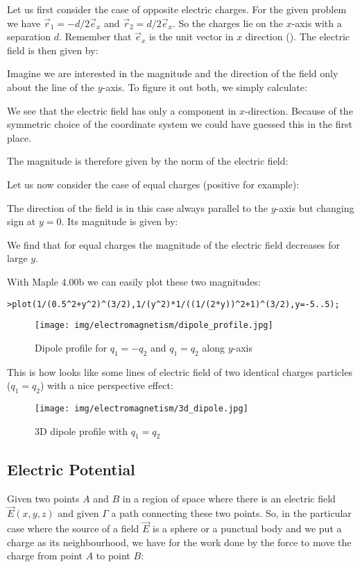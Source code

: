	Let us first consider the case of opposite electric charges. For the given problem we have $\vec{r}_1=-d/2\vec{e}_x$ and $\vec{r}_2=d/2\vec{e}_x$. So the charges lie on the $x$-axis with a separation $d$. Remember that $\vec{e}_x$ is the unit vector in $x$ direction (). The electric field is then given by:
	
	Imagine we are interested in the magnitude and the direction of the field only about the line of the $y$-axis. To figure it out both, we simply calculate:
	
	We see that the electric field has only a component in $x$-direction. Because of the symmetric choice of the coordinate system we could have guessed this in the first place.
	
	The magnitude is therefore given by the norm of the electric field:
	
	Let us now consider the case of equal charges (positive for example):
	
	The direction of the field is in this case always parallel to the $y$-axis but changing sign at $y=0$. Its magnitude is given by:
	
	We find that for equal charges the magnitude of the electric field decreases for large $y$.
	
	With Maple 4.00b we can easily plot these two magnitudes:
	
	\texttt{>plot({1/(0.5\string^2+y\string^2)\string^(3/2),1/(y\string^2)*1/((1/(2*y))\string^2+1)\string^(3/2)},y=-5..5);}
	\begin{figure}[H]
		\centering
		\texttt{[image: img/electromagnetism/dipole\_profile.jpg]}
		\caption{Dipole profile for $q_1=-q_2$ and $q_1=q_2$ along $y$-axis}
	\end{figure}
	This is how looks like some lines of electric field of two identical charges particles ($q_1=q_2$) with a nice perspective effect:
	\begin{figure}[H]
		\centering
		\texttt{[image: img/electromagnetism/3d\_dipole.jpg]}
		\caption{3D dipole profile with $q_1=q_2$}
	\end{figure}
	
	\pagebreak
	\subsection{Electric Potential}\label{electric potential}
	 Given two points $A$ and $B$ in a region of space where there is an electric field $\vec{E}(x,y,z)$ and given $\Gamma$ a path connecting these two points. So, in the particular case where the source of a field $\vec{E}$ is a sphere or a punctual body and we put  a charge as its neighbourhood, we have for the work done by the force to move the charge from point $A$ to point $B$:
	 
